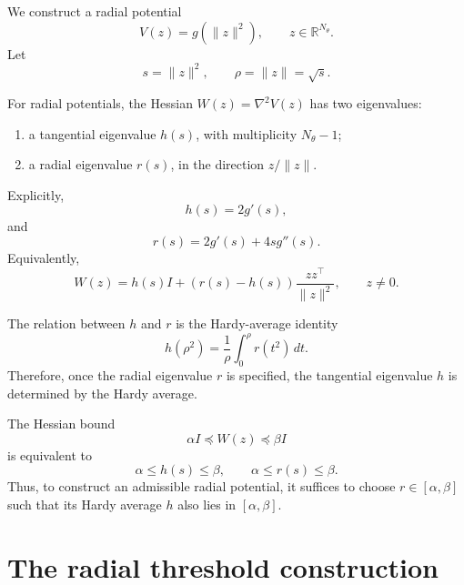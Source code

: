 \documentclass[11pt]{article}
\numberwithin{equation}{section}
\begin{document}
We construct a radial potential
\begin{equation}
    V(z)=g(\|z\|^2),
    \qquad
    z\in\mathbb R^{N_\theta}.
\end{equation}
Let
\begin{equation}
    s=\|z\|^2,
    \qquad
    \rho=\|z\|=\sqrt{s}.
\end{equation}

For radial potentials, the Hessian $W(z)=\nabla^2 V(z)$ has two eigenvalues:
\begin{enumerate}[label=(\roman*)]
    \item a tangential eigenvalue $h(s)$, with multiplicity $N_\theta-1$;
    \item a radial eigenvalue $r(s)$, in the direction $z/\|z\|$.
\end{enumerate}
Explicitly,
\begin{equation}
    h(s)=2g'(s),
\end{equation}
and
\begin{equation}
    r(s)=2g'(s)+4s g''(s).
\end{equation}
Equivalently,
\begin{equation}
    W(z)
    =
    h(s)I
    +
    (r(s)-h(s))
    \frac{zz^\top}{\|z\|^2},
    \qquad
    z\neq 0.
\end{equation}

The relation between $h$ and $r$ is the Hardy-average identity
\begin{equation}
    h(\rho^2)
    =
    \frac{1}{\rho}
    \int_0^\rho r(t^2)\,dt.
\end{equation}
Therefore, once the radial eigenvalue $r$ is specified, the tangential eigenvalue $h$ is determined by the Hardy average.

The Hessian bound
\begin{equation}
    \alpha I
    \preceq
    W(z)
    \preceq
    \beta I
\end{equation}
is equivalent to
\begin{equation}
    \alpha\le h(s)\le \beta,
    \qquad
    \alpha\le r(s)\le \beta.
\end{equation}
Thus, to construct an admissible radial potential, it suffices to choose $r\in[\alpha,\beta]$ such that its Hardy average $h$ also lies in $[\alpha,\beta]$.

\section{The radial threshold construction}
\end{document}

